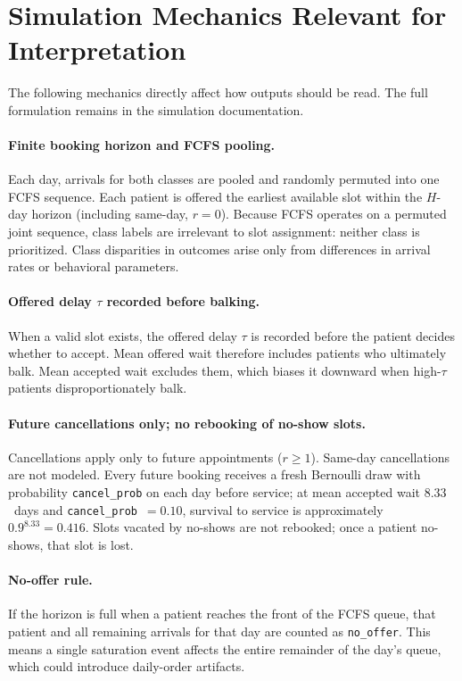 \documentclass[11pt]{article}
\begin{document}
\newpage
\tableofcontents
\newpage

\section{Simulation Mechanics Relevant for Interpretation}
\label{sec:mechanics}

The following mechanics directly affect how outputs should be read. The full
formulation remains in the simulation documentation.

\paragraph{Finite booking horizon and FCFS pooling.}
Each day, arrivals for both classes are pooled and randomly permuted into one
FCFS sequence. Each patient is offered the earliest available slot within the
$H$-day horizon (including same-day, $r=0$). Because FCFS operates on a
permuted joint sequence, class labels are irrelevant to slot assignment:
neither class is prioritized. Class disparities in outcomes arise only from
differences in arrival rates or behavioral parameters.

\paragraph{Offered delay $\tau$ recorded before balking.}
When a valid slot exists, the offered delay $\tau$ is recorded before the
patient decides whether to accept. Mean offered wait therefore includes
patients who ultimately balk. Mean accepted wait excludes them, which biases
it downward when high-$\tau$ patients disproportionately balk.

\paragraph{Future cancellations only; no rebooking of no-show slots.}
Cancellations apply only to future appointments ($r \geq 1$). Same-day
cancellations are not modeled. Every future booking receives a fresh
Bernoulli draw with probability \texttt{cancel\_prob} on each day before
service; at mean accepted wait $8.33$~days and \texttt{cancel\_prob}~$=0.10$,
survival to service is approximately $0.9^{8.33}=0.416$. Slots vacated by
no-shows are not rebooked; once a patient no-shows, that slot is lost.

\paragraph{No-offer rule.}
If the horizon is full when a patient reaches the front of the FCFS queue,
that patient and all remaining arrivals for that day are counted as
\texttt{no\_offer}. This means a single saturation event affects the entire
remainder of the day's queue, which could introduce daily-order artifacts.
\end{document}
